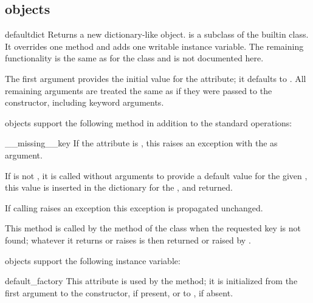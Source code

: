 \subsection{ objects \label{defaultdict-objects}}

\begin{funcdesc}{defaultdict}{}
  Returns a new dictionary-like object.   is a subclass
  of the builtin  class.  It overrides one method and adds one
  writable instance variable.  The remaining functionality is the same as
  for the  class and is not documented here.

  The first argument provides the initial value for the
   attribute; it defaults to .
  All remaining arguments are treated the same as if they were
  passed to the  constructor, including keyword arguments.

\end{funcdesc}

 objects support the following method in addition to
the standard  operations:

\begin{methoddesc}{__missing__}{key}
  If the  attribute is , this raises
  an  exception with the  as argument.

  If  is not , it is called without
  arguments to provide a default value for the given , this
  value is inserted in the dictionary for the , and returned.

  If calling  raises an exception this exception
  is propagated unchanged.

  This method is called by the  method of the
   class when the requested key is not found; whatever it
  returns or raises is then returned or raised by .
\end{methoddesc}

 objects support the following instance variable:

\begin{datadesc}{default_factory}
  This attribute is used by the  method; it is initialized
  from the first argument to the constructor, if present, or to , 
  if absent.
\end{datadesc}


